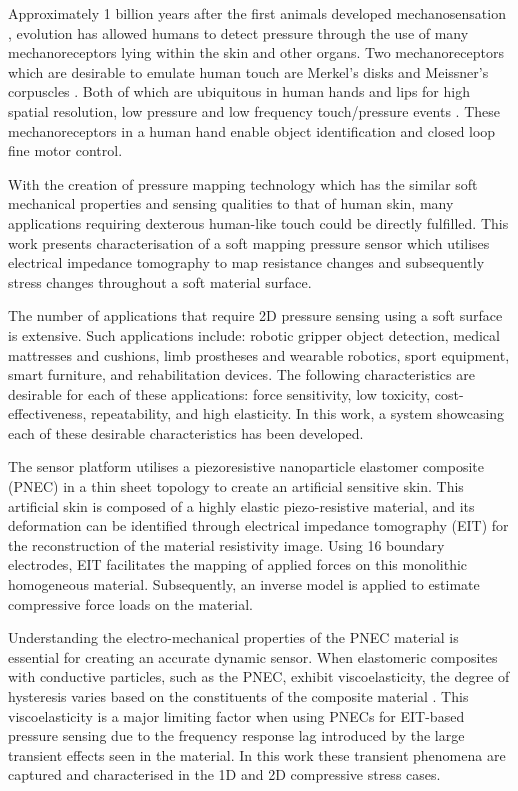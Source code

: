 Approximately 1 billion years after the first animals developed mechanosensation \citep{Parfrey2011}, evolution has allowed humans to detect pressure through the use of many mechanoreceptors lying within the skin and other organs. Two mechanoreceptors which are desirable to emulate human touch are Merkel's disks and Meissner's corpuscles \citep{Kamkim2008}. Both of which are ubiquitous in human hands and lips for high spatial resolution, low pressure and low frequency touch/pressure events \citep{Molnar2015}. These mechanoreceptors in a human hand enable object identification and closed loop fine motor control. 

With the creation of pressure mapping technology which has the similar soft mechanical properties and sensing qualities to that of human skin, many applications requiring dexterous human-like touch could be directly fulfilled. This work presents characterisation of a soft mapping pressure sensor which utilises electrical impedance tomography to map resistance changes and subsequently stress changes throughout a soft material surface. 

The number of applications that require 2D pressure sensing using a soft surface is extensive. Such applications include: robotic gripper object detection, medical mattresses and cushions, limb prostheses and wearable robotics, sport equipment, smart furniture, and rehabilitation devices. The following characteristics are desirable for each of these applications: force sensitivity, low toxicity, cost-effectiveness, repeatability, and high elasticity. In this work, a system showcasing each of these desirable characteristics has been developed. 

The sensor platform utilises a piezoresistive nanoparticle elastomer composite (PNEC) in a thin sheet topology to create an artificial sensitive skin. This artificial skin is composed of a highly elastic piezo-resistive material, and its deformation can be identified through electrical impedance tomography (EIT) for the reconstruction of the material resistivity image. Using 16 boundary electrodes, EIT facilitates the mapping of applied forces on this monolithic homogeneous material. Subsequently, an inverse model is applied to estimate compressive force loads on the material.

Understanding the electro-mechanical properties of the PNEC material is essential for creating an accurate dynamic sensor. When elastomeric composites with conductive particles, such as the PNEC, exhibit viscoelasticity, the degree of hysteresis varies based on the constituents of the composite material \citep{Ellingham2021}. This viscoelasticity is a major limiting factor when using PNECs for EIT-based pressure sensing due to the frequency response lag introduced by the large transient effects seen in the material. In this work these transient phenomena are captured and characterised in the 1D and 2D compressive stress cases.


